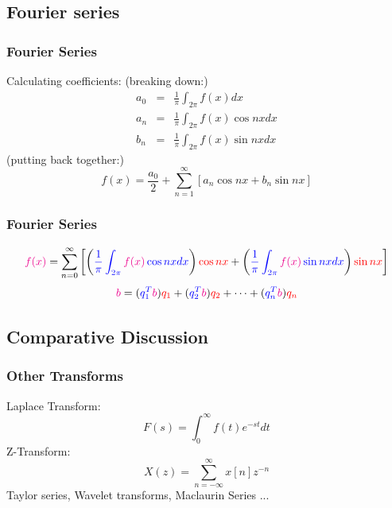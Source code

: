 \documentclass{beamer}
\newtheorem{Key points}{Key points}
\newcommand\Fontviaa{\fontsize{8}{7.2}\selectfont}
\begin{document}
\subsection{Fourier series}
\begin{frame}
  \frametitle{Fourier Series }
  Calculating coefficients: (breaking down:)
  \begin{eqnarray*}
  a_0 & = &  \frac{1}{\pi}\int_{2\pi}{f(x)dx}\\ 
  a_n & = &  \frac{1}{\pi}\int_{2\pi}{f(x)\cos{nx}dx}\\
  b_n & = &  \frac{1}{\pi}\int_{2\pi}{f(x)\sin{nx}dx} 
  \end{eqnarray*}
(putting back together:)
  \begin{equation*}
    f(x)= \frac{a_0}{2}+ \sum_{n=1}^{\infty}[a_n\cos{nx}+b_n\sin{nx}]
  \end{equation*}
\end{frame}
\begin{frame}
  \frametitle{Fourier Series}
\Fontviaa
  \begin{equation*}
     {\color{magenta}f(x)}= \sum_{n=0}^{\infty}\left[\left({\color{blue}\frac{1}{\pi}\int_{2\pi}{{\color{magenta}f(x)}\cos{nx}dx}}\right){\color{red}\cos{nx}}+\left({\color{blue}\frac{1}{\pi}\int_{2\pi}{{\color{magenta}f(x)}\sin{nx}dx}}\right){\color{red}{\color{red}\sin{nx}}}\right]
  \end{equation*}
  \begin{equation*}
    {\color{magenta}b}=({\color{blue}q_1^T{\color{magenta}b}}){\color{red}q_1}+({\color{blue}q_2^T{\color{magenta}b}}){\color{red}q_2}+\cdots+({\color{blue}q_n^T{\color{magenta}b}}){\color{red}q_n}
  \end{equation*}
\vfill
{}
\end{frame}
\subsection{Comparative Discussion}
\begin{frame}
  \frametitle{Other Transforms}
Laplace Transform:
  {\begin{equation*}
    F(s)= \int_0^\infty{f(t)e^{-st}dt}
  \end{equation*}
}
{Z-Transform:
\begin{equation*}
  X(z)=\sum_{n=-\infty}^{\infty}x[n]z^{-n}
\end{equation*}}
 Taylor series, Wavelet transforms, Maclaurin Series ...
\end{frame}
\end{document}
